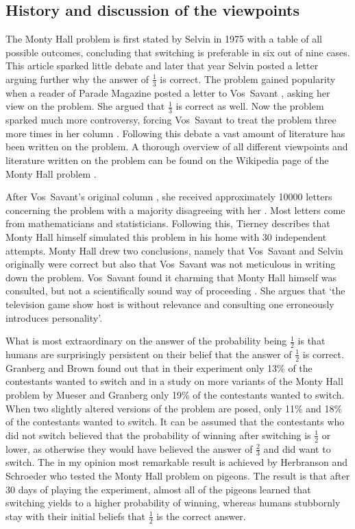 \documentclass[a4paper]{report}
\theoremstyle{plain}
\theoremstyle{definition}
\theoremstyle{remark}
\numberwithin{equation}{chapter}
\DeclareMathOperator{\1}{\mathbbm{1}}
\begin{document}
\subsection{History and discussion of the viewpoints}\label{sec:MontyHist}
The Monty Hall problem is first stated by Selvin in 1975 \cite{Selvin75a} with a table of all possible outcomes, concluding that switching is preferable in six out of nine cases. This article sparked little debate and later that year Selvin \cite{Selvin75b} posted a letter arguing further why the answer of $\frac{1}{3}$ is correct. The problem gained popularity when a reader of Parade Magazine posted a letter to Vos~Savant \cite{Marilyn90a}, asking her view on the problem. She argued that $\frac{1}{3}$ is correct as well. Now the problem sparked much more controversy, forcing Vos~Savant to treat the problem three more times in her column \cite{Marilyn90b,Marilyn91a,Marilyn91b}. Following this debate a vast amount of literature has been written on the problem. A thorough overview of all different viewpoints and literature written on the problem can be found on the Wikipedia page of the Monty Hall problem \cite{WikiMonty}.

After Vos~Savant's original column \cite{Marilyn90a}, she received approximately 10000 letters concerning the problem with a majority disagreeing with her \cite{Tierney91}. Most letters come from mathematicians and statisticians. Following this, Tierney \cite{Tierney91} describes that Monty Hall himself simulated this problem in his home with 30 independent attempts. Monty Hall drew two conclusions, namely that Vos~Savant and Selvin originally were correct but also that Vos~Savant was not meticulous in writing down the problem. Vos~Savant found it charming that Monty Hall himself was consulted, but not a scientifically sound way of proceeding \cite{Savant91c}. She argues that `the television game show host is without relevance and consulting one erroneously introduces personality'.

What is most extraordinary on the answer of the probability being $\frac{1}{2}$ is that humans are surprisingly persistent on their belief that the answer of $\frac{1}{2}$ is correct. Granberg and Brown \cite{Granberg95} found out that in their experiment only 13\% of the contestants wanted to switch and in a study on more variants of the Monty Hall problem by Mueser and Granberg \cite{Mueser99} only 19\% of the contestants wanted to switch. When two slightly altered versions of the problem are posed, only 11\% and 18\% of the contestants wanted to switch. It can be assumed that the contestants who did not switch believed that the probability of winning after switching is $\frac{1}{2}$ or lower, as otherwise they would have believed the answer of $\frac{2}{3}$ and did want to switch. The in my opinion most remarkable result is achieved by Herbranson and Schroeder \cite{Herbranson10} who tested the Monty Hall problem on pigeons. The result is that after 30 days of playing the experiment, almost all of the pigeons learned that switching yields to a higher probability of winning, whereas humans stubbornly stay with their initial beliefs that $\frac{1}{2}$ is the correct answer.
\end{document}
